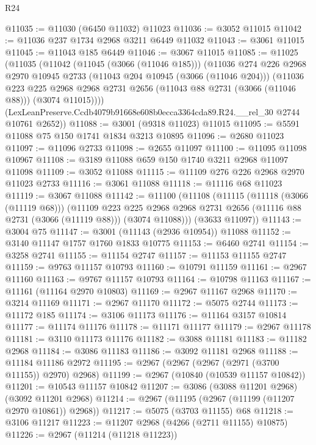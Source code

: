 \begin{lexlean}{R24}
\begin{coremodule}
@11035 := @11030 (@6450 @11032) @11023
@11036 := @3052 @11015
@11042 := @11036 @237 @1734 @2968 @3211 @6449 @11032
@11043 := @3061 @11015
@11045 := @11043 @185 @6449
@11046 := @3067 @11015
@11085 := @11025
    (@11035
      (@11042
        (@11045 (@3066 (@11046 @185)))
        (@11036
          @274
          @226
          @2968
          @2970
          @10945
          @2733
          (@11043 @204 @10945 (@3066 (@11046 @204)))
          (@11036
            @223
            @225
            @2968
            @2968
            @2731
            @2656
            (@11043 @88 @2731 (@3066 (@11046 @88)))
            (@3074 @11015))))
      (LexLeanPreserve.Ccdb4079b91668e608b0ecca3364cda89.R24.__rel_30 @2744 @10761 @2652))
@11088 := @3001 (@9318 @11023) @11015
@11095 := @5591 @11088 @75 @150 @1741 @1834 @3213 @10895
@11096 := @2680 @11023
@11097 := @11096 @2733
@11098 := @2655 @11097
@11100 := @11095 @11098 @10967
@11108 := @3189 @11088 @659 @150 @1740 @3211 @2968 @11097 @11098
@11109 := @3052 @11088
@11115 := @11109 @276 @226 @2968 @2970 @11023 @2733
@11116 := @3061 @11088
@11118 := @11116 @68 @11023
@11119 := @3067 @11088
@11142 := @11100
    (@11108
      (@11115
        (@11118 (@3066 (@11119 @68)))
        (@11109
          @223
          @225
          @2968
          @2968
          @2731
          @2656
          (@11116 @88 @2731 (@3066 (@11119 @88)))
          (@3074 @11088)))
      (@3633 @11097))
@11143 := @3004 @75
@11147 := @3001 (@11143 (@2936 @10954)) @11088
@11152 := @3140 @11147 @1757 @1760 @1833 @10775
@11153 := @6460 @2741
@11154 := @3258 @2741
@11155 := @11154 @2747
@11157 := @11153 @11155 @2747
@11159 := @9763 @11157 @10793
@11160 := @10791 @11159
@11161 := @2967 @11160
@11163 := @9767 @11157 @10793
@11164 := @10798 @11163
@11167 := @11161 (@11164 @2970 @10803)
@11169 := @2967 @11167 @2968
@11170 := @3214 @11169
@11171 := @2967 @11170
@11172 := @5075 @2744
@11173 := @11172 @185
@11174 := @3106 @11173
@11176 := @11164 @3157 @10814
@11177 := @11174 @11176
@11178 := @11171 @11177
@11179 := @2967 @11178
@11181 := @3110 @11173 @11176
@11182 := @3088 @11181
@11183 := @11182 @2968
@11184 := @3086 @11183
@11186 := @3092 @11181 @2968
@11188 := @11184 @11186 @2972
@11195 := @2967 (@2967 (@2967 (@2971 (@3700 @11155)) @2970) @2968)
@11199 := @2967 (@10840 (@10539 @11157 @10842))
@11201 := @10543 @11157 @10842
@11207 := @3086 (@3088 @11201 @2968) (@3092 @11201 @2968)
@11214 := @2967 (@11195 (@2967 (@11199 (@11207 @2970 @10861)) @2968))
@11217 := @5075 (@3703 @11155) @68
@11218 := @3106 @11217
@11223 := @11207 @2968 (@4266 (@2711 @11155) @10875)
@11226 := @2967 (@11214 (@11218 @11223))

\end{coremodule}
\end{lexlean}

